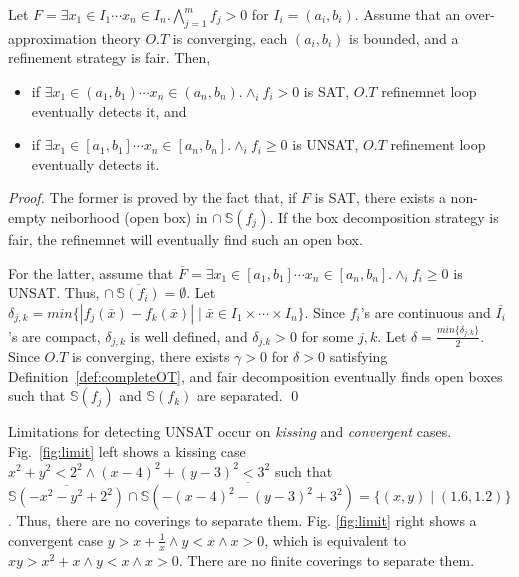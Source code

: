 \documentclass[runningheads,a4paper,oribibl]{llncs}
\begin{document}
\begin{theorem} \label{th:RelComp}
Let
$F = \exists x_1 \in I_1 \cdots x_n \in I_n. \bigwedge \limits_{j=1}^m f_j > 0$
for $I_i = (a_i,b_i)$.
Assume that an over-approximation theory $O.T$ is converging, 
each $(a_i,b_i)$ is bounded, and a refinement strategy is fair. 
Then, 
\begin{itemize}
\item if $\exists x_1 \in (a_1,b_1) \cdots x_n \in (a_n,b_n) . \wedge_{i} f_i > 0$ is SAT, 
$O.T$ refinemnet loop eventually detects it, and
\item if $\exists x_1 \in [a_1,b_1] \cdots x_n \in [a_n,b_n] . \wedge_{i} f_i \geq 0$ is UNSAT, 
$O.T$ refinement loop eventually detects it.  
\end{itemize}
\end{theorem}


\begin{proof} 
The former is proved by the fact that, if $F$ is SAT, there exists a non-empty neiborhood (open box) 
in $\cap~\mathbb{S}(f_j)$. 
If the box decomposition strategy is fair, the refinemnet will eventually find such an open box. 

For the latter, assume that 
$\overline{F} = \exists x_1 \in [a_1,b_1] \cdots x_n \in [a_n,b_n] . \wedge_{i} f_i \geq 0$ is UNSAT. 
Thus, $\cap~\overline{\mathbb{S}(f_i)} = \emptyset$. 
Let $\delta_{j,k} = min \{|f_j(\bar{x}) - f_k(\bar{x})| \mid \bar{x} \in I_1 \times \cdots \times I_n\}$. 
Since $f_i$'s are continuous and $\overline{I_i}$'s are compact, $\delta_{j,k}$ is well defined,
and $\delta_{j.k} > 0$ for some $j,k$. 
Let $\delta = \frac{min \{ \delta_{j,k} \}}{2}$. 
Since $O.T$ is converging, there exists $\gamma > 0$ for $\delta > 0$ 
satisfying Definition~\ref{def:completeOT}, and fair decomposition eventually finds open boxes
such that $\mathbb{S}(f_j)$ and $\mathbb{S}(f_k)$ are separated. 
\qed
\end{proof}

Limitations for detecting UNSAT occur on \emph{kissing} and \emph{convergent} cases. 
Fig.~\ref{fig:limit} left shows a kissing case 
$x^2 + y^2 < 2^2 \wedge (x-4)^2 + (y-3)^2 < 3^2$ such that 
$\overline{\mathbb{S}(- x^2 - y^2 + 2^2)} \cap \overline{\mathbb{S}(- (x-4)^2 - (y-3)^2 + 3^2)} 
= \{(x,y) \mid (1.6, 1.2)\}$. 
Thus, there are no coverings to separate them. 
%
Fig. \ref{fig:limit} right shows a convergent case 
$y > x + \frac{1}{x} \wedge y < x \wedge x > 0$, which is equivalent to 
$xy > x^2 + x \wedge y < x \wedge x > 0$. 
There are no finite coverings to separate them. 
\end{document}
